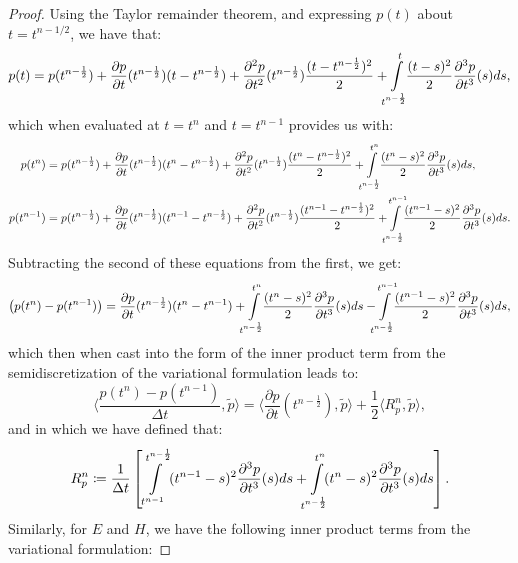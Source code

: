 \documentclass{amsart}
\theoremstyle{thmstyleone}%
\theoremstyle{thmstyletwo}%
\theoremstyle{thmstylethree}%
\newcommand{\ainnerproduct}[2]{\langle #1, #2 \rangle}
\begin{document}
\begin{proof}
Using the Taylor remainder theorem, and expressing $p(t)$ about $t = t^{n - 1/2}$, we have that:
\[
  p(t) = p(t^{n - \frac{1}{2}}) + \dfrac{\partial p}{\partial t}(t^{n - \frac{1}{2}}) (t - t^{n - \frac{1}{2}}) + \dfrac{\partial^2 p}{\partial t^2}(t^{n - \frac{1}{2}}) \dfrac{(t - t^{n - \frac{1}{2}})^2}{2} + \int\limits_{\mathclap{t^{n - \frac{1}{2}}}}^{t} \dfrac{(t - s)^2}{2} \dfrac{\partial^3 p}{\partial t^3}(s) ds,
\]
which when evaluated at $t = t^n$ and $t = t^{n - 1}$ provides us with:
\begin{align*}
    p(t^n) &= p(t^{n - \frac{1}{2}}) + \dfrac{\partial p}{\partial t}(t^{n - \frac{1}{2}}) (t^n - t^{n - \frac{1}{2}}) + \dfrac{\partial^2 p}{\partial t^2}(t^{n - \frac{1}{2}}) \dfrac{(t^n - t^{n - \frac{1}{2}})^2}{2} + \int\limits_{\mathclap{t^{n - \frac{1}{2}}}}^{t^n} \dfrac{(t^n - s)^2}{2} \dfrac{\partial^3 p}{\partial t^3}(s) ds, \\
  p(t^{n - 1}) &= p(t^{n - \frac{1}{2}}) + \dfrac{\partial p}{\partial t}(t^{n - \frac{1}{2}}) (t^{n - 1} - t^{n - \frac{1}{2}}) + \dfrac{\partial^2 p}{\partial t^2}(t^{n - \frac{1}{2}}) \dfrac{(t^{n - 1} - t^{n - \frac{1}{2}})^2}{2} + \int\limits_{\mathclap{t^{n - \frac{1}{2}}}}^{\mathclap{t^{n - 1}}} \dfrac{(t^{n - 1} - s)^2}{2} \dfrac{\partial^3 p}{\partial t^3}(s) ds.
\end{align*}
Subtracting the second of these equations from the first, we get:
\[
  \left( p(t^n) - p(t^{n - 1}) \right) = \dfrac{\partial p}{\partial t}(t^{n - \frac{1}{2}}) (t^n - t^{n - 1}) + \int\limits_{\mathclap{t^{n - \frac{1}{2}}}}^{t^n} \dfrac{(t^n - s)^2}{2} \dfrac{\partial^3 p}{\partial t^3}(s) ds - \int\limits_{\mathclap{t^{n - \frac{1}{2}}}}^{\mathclap{t^{n - 1}}} \dfrac{(t^{n - 1} - s)^2}{2} \dfrac{\partial^3 p}{\partial t^3}(s) ds,
\]
which then when cast into the form of the inner product term from the semidiscretization of the variational formulation leads to:
\[
  \ainnerproduct{\dfrac{p(t^n) - p(t^{n - 1})}{\Delta t}}{\widetilde{p}} = \ainnerproduct{\dfrac{\partial p}{\partial t}(t^{n - \frac{1}{2}})}{\widetilde{p}} + \dfrac{1}{2}\ainnerproduct{R^n_p}{\widetilde{p}},
\]
and in which we have defined that:
\[
  R^n_p \coloneq \dfrac{1}{\Delta t} \left[ \int\limits_{t^{n - 1}}^{t^{n - \frac{1}{2}}} (t^{n - 1} - s)^2 \dfrac{\partial^3 p}{\partial t^3}(s) ds + \int\limits_{\mathclap{t^{n - \frac{1}{2}}}}^{t^n} (t^n - s)^2 \dfrac{\partial^3 p}{\partial t^3}(s) ds \right].
\]
Similarly, for $E$ and $H$, we have the following inner product terms from the variational formulation:

\end{proof}
\end{document}

